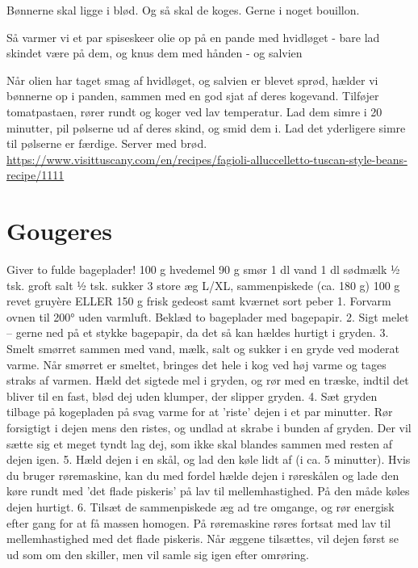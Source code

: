 \documentclass[
]{book}
\begin{document}
Bønnerne skal ligge i blød. Og så skal de koges. Gerne i noget bouillon.

Så varmer vi et par spiseskeer olie op på en pande med hvidløget -
bare lad skindet være på dem, og knus dem med hånden - og salvien

Når olien har taget smag af hvidløget, og salvien er blevet sprød,
hælder vi bønnerne op i panden, sammen med en god sjat af deres kogevand.
Tilføjer tomatpastaen, rører rundt og koger ved lav temperatur. Lad dem
simre i 20 minutter, pil pølserne ud af deres skind, og smid dem i. Lad det yderligere
simre til pølserne er færdige. Server med brød.
\url{https://www.visittuscany.com/en/recipes/fagioli-alluccelletto-tuscan-style-beans-recipe/1111}

\hypertarget{gougeres}{%
\section{Gougeres}\label{gougeres}}

Giver to fulde bageplader!
100 g hvedemel
90 g smør
1 dl vand
1 dl sødmælk
1⁄2 tsk. groft salt
1⁄2 tsk. sukker
3 store æg L/XL, sammenpiskede (ca. 180 g)
100 g revet gruyère ELLER 150 g frisk gedeost samt kværnet sort peber
1. Forvarm ovnen til 200° uden varmluft. Beklæd to bageplader med bagepapir.
2. Sigt melet -- gerne ned på et stykke bagepapir, da det så kan hældes hurtigt i gryden.
3. Smelt smørret sammen med vand, mælk, salt og sukker i en gryde ved moderat varme. Når smørret er
smeltet, bringes det hele i kog ved høj varme og tages straks af varmen. Hæld det sigtede mel i gryden,
og rør med en træske, indtil det bliver til en fast, blød dej uden klumper, der slipper gryden.
4. Sæt gryden tilbage på kogepladen på svag varme for at 'riste' dejen i et par minutter. Rør forsigtigt i
dejen mens den ristes, og undlad at skrabe i bunden af gryden. Der vil sætte sig et meget tyndt lag dej,
som ikke skal blandes sammen med resten af dejen igen.
5. Hæld dejen i en skål, og lad den køle lidt af (i ca. 5 minutter). Hvis du bruger røremaskine, kan du
med fordel hælde dejen i røreskålen og lade den køre rundt med 'det flade piskeris' på lav til
mellemhastighed. På den måde køles dejen hurtigt.
6. Tilsæt de sammenpiskede æg ad tre omgange, og rør energisk efter gang for at få massen homogen.
På røremaskine røres fortsat med lav til mellemhastighed med det flade piskeris. Når æggene tilsættes,
vil dejen først se ud som om den skiller, men vil samle sig igen efter omrøring.
\end{document}
